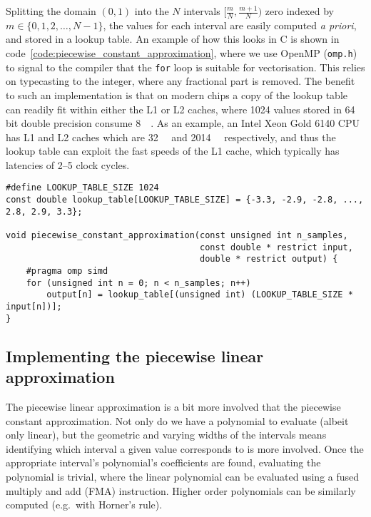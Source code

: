 \documentclass[manuscript,review]{acmart}
\begin{document}
Splitting the domain $ (0, 1) $ into the $ N $ intervals $ [\tfrac{m}{N}, \tfrac{m+1}{N}) $ zero indexed by $ m \in \{0,1,2,\ldots,N-1\}$, the values for each interval are easily computed \textit{a priori}, and stored in a lookup table. An example of how this looks in C is shown in code~\ref{code:piecewise_constant_approximation}, where we use OpenMP (\texttt{omp.h}) to signal to the compiler that the \texttt{for} loop is suitable for vectorisation. This relies on typecasting to the integer, where any fractional part is removed. The benefit to such an implementation is that on modern chips a copy of the lookup table can readily fit within either the L1 or L2 caches, where 1024 values stored in 64 bit double precision consume \SI{8}{\kilo\byte}. As an example, an Intel Xeon Gold 6140 CPU has L1 and L2 caches which are \SI{32}{\kilo\byte} and \SI{2014}{\kilo\byte} respectively, and thus the lookup table can exploit the fast speeds of the L1 cache, which typically has latencies of 2--5 clock cycles. 

\begin{lstfloat}[htb]
\begin{lstlisting}[style=C, caption={C implementation of the piecewise constant approximation.}, label={code:piecewise_constant_approximation}]
#define LOOKUP_TABLE_SIZE 1024
const double lookup_table[LOOKUP_TABLE_SIZE] = {-3.3, -2.9, -2.8, ..., 2.8, 2.9, 3.3};

void piecewise_constant_approximation(const unsigned int n_samples, 
                                      const double * restrict input, 
                                      double * restrict output) {
    #pragma omp simd
    for (unsigned int n = 0; n < n_samples; n++) 
        output[n] = lookup_table[(unsigned int) (LOOKUP_TABLE_SIZE * input[n])];
}
\end{lstlisting}
\end{lstfloat}

\subsection{Implementing the piecewise linear approximation}

The piecewise linear approximation is a bit more involved that the piecewise constant approximation. Not only do we have a polynomial to evaluate (albeit only linear), but the geometric and varying widths of the intervals means identifying which interval a given value corresponds to is more involved. Once the appropriate interval's polynomial's coefficients are found, evaluating the polynomial is trivial, where the linear polynomial can be evaluated using a fused multiply and add (FMA) instruction. Higher order polynomials can be similarly computed (e.g.\ with Horner's rule). 
\end{document}
